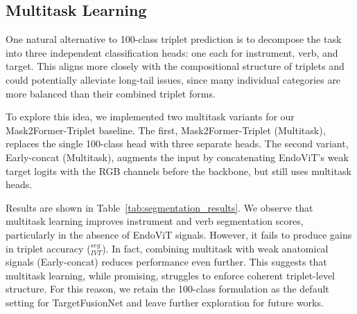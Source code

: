 \begin{table}[t!]
\centering
\caption{Segmentation performance ($\mAP^{seg}$) for Mask2Former-Triplet and multitask learning versions. While multitask variants improve individual component scores (e.g., instrument, verb), they fail to improve overall triplet accuracy ($\mAP_{IVT}^{seg}$), highlighting the challenge of enforcing coherent triplet structure.}
\label{tab:segmentation_results}
\end{table}


\subsection{Multitask Learning}
One natural alternative to 100-class triplet prediction is to decompose the task into three independent classification heads: one each for instrument, verb, and target. This aligns more closely with the compositional structure of triplets and could potentially alleviate long-tail issues, since many individual categories are more balanced than their combined triplet forms.

To explore this idea, we implemented two multitask variants for our Mask2Former-Triplet baseline. The first, Mask2Former-Triplet (Multitask), replaces the single 100-class head with three separate heads. The second variant, Early-concat (Multitask), augments the input by concatenating EndoViT's weak target logits with the RGB channels before the backbone, but still uses multitask heads.

Results are shown in Table~\ref{tab:segmentation_results}. We observe that multitask learning improves instrument and verb segmentation scores, particularly in the absence of EndoViT signals. However, it fails to produce gains in triplet accuracy (\mAP$_{IVT}^{seg}$). In fact, combining multitask with weak anatomical signals (Early-concat) reduces performance even further. This suggests that multitask learning, while promising, struggles to enforce coherent triplet-level structure. For this reason, we retain the 100-class formulation as the default setting for TargetFusionNet and leave further exploration for future works.


